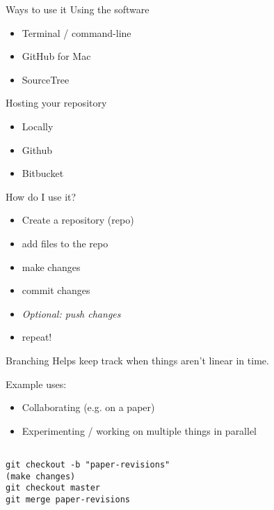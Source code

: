 \documentclass{beamer}
\begin{document}
\begin{frame}{Ways to use it}
    Using the software
    \begin{itemize}
        \item Terminal / command-line
        \item GitHub for Mac
        \item SourceTree
    \end{itemize}
    Hosting your repository
    \begin{itemize}
        \item Locally
        \item Github
        \item Bitbucket
    \end{itemize}
\end{frame}

\begin{frame}{How do I use it?}
  \begin{itemize}
  \item Create a repository (repo)
  \item add files to the repo
  \item make changes
  \item commit changes
  \item \textit{Optional: push changes}
  \item repeat!
  \end{itemize}

\end{frame}

\begin{frame}[fragile]
    \begin{block}{Branching}
        Helps keep track when things aren't linear in time.

        Example uses:
        \begin{itemize}
            \item Collaborating (e.g. on a paper)
            \item Experimenting / working on multiple things in parallel
        \end{itemize}

        \begin{verbatim}

git checkout -b "paper-revisions"
(make changes)
git checkout master
git merge paper-revisions

        \end{verbatim}
    \end{block}
\end{frame}
\end{document}
